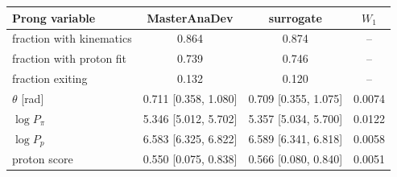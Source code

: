 \begin{tabular}{lccc}
\toprule
Prong variable & MasterAnaDev & surrogate & $W_1$ \\
\midrule
fraction with kinematics & 0.864 & 0.874 & -- \\
fraction with proton fit & 0.739 & 0.746 & -- \\
fraction exiting & 0.132 & 0.120 & -- \\
$\theta$ [rad] & 0.711 [0.358, 1.080] & 0.709 [0.355, 1.075] & 0.0074 \\
$\log P_\pi$ & 5.346 [5.012, 5.702] & 5.357 [5.034, 5.700] & 0.0122 \\
$\log P_p$ & 6.583 [6.325, 6.822] & 6.589 [6.341, 6.818] & 0.0058 \\
proton score & 0.550 [0.075, 0.838] & 0.566 [0.080, 0.840] & 0.0051 \\
\bottomrule
\end{tabular}
